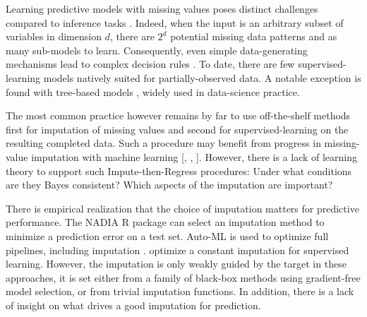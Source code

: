 \documentclass{article}
\theoremstyle{plain}
\begin{document}
Learning predictive models with missing values poses distinct challenges compared to inference tasks \citep{josse2019consistency}. Indeed, when the input is an arbitrary subset of variables in dimension $d$, there are $2^d$ potential missing data patterns and as many sub-models to learn. Consequently, even simple data-generating mechanisms lead to complex decision rules \citep{LeMorvan2020Linear}. To date, there are few supervised-learning models natively suited for partially-observed data. A notable exception is found with tree-based models \citep{Twala2008_mia,chen2016xgboost}, widely used in data-science practice. 

The most common practice however remains by far to use off-the-shelf methods first for imputation of missing values and second for supervised-learning on the resulting completed data. Such a procedure may benefit from progress in missing-value imputation with machine learning [\citealt{VanBuuren2018Flexible}, \mbox{\citealt{yoon2018gain}}, \citealt{Mattei2019MIWAE}]. 
However, there is a lack of learning theory to support such Impute-then-Regress procedures: Under what conditions are they Bayes consistent? Which aspects of the imputation are important?

There is empirical realization that the choice of imputation matters for predictive performance. The NADIA R package \citep{nadia_R} can select an imputation method to minimize a prediction error on a test set.
Auto-ML is used to optimize full pipelines, including imputation \cite[eg][]{jarrett2021clairvoyance}.
\citet{ipsen2020deal} optimize a constant imputation for supervised learning. However, the imputation is only weakly guided by the target in these approaches, it is set either from a family of black-box methods using gradient-free model selection, or from trivial imputation functions. In addition, there is a lack of insight on what drives a good imputation for prediction.
\end{document}
